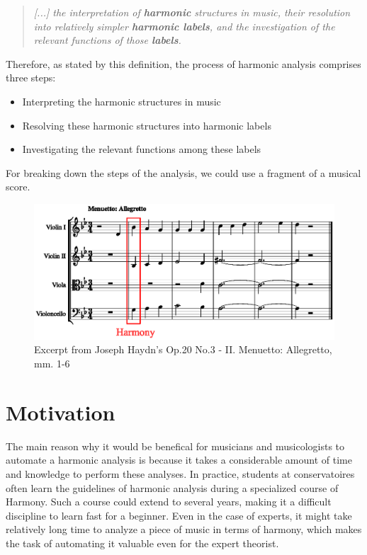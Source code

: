 \begin{quote}
\centering
\emph{[...] the interpretation of \textbf{harmonic} structures in music, \linebreak
their resolution into relatively simpler \textbf{harmonic labels}, \linebreak and the investigation of the relevant functions of those \textbf{labels}.}
\end{quote}

Therefore, as stated by this definition, the process of harmonic analysis comprises three steps:

\begin{itemize}
  \item Interpreting the harmonic structures in music
  \item Resolving these harmonic structures into harmonic labels
  \item Investigating the relevant functions among these labels
\end{itemize}

For breaking down the steps of the analysis, we could use a fragment of a musical score.

\begin{figure}[ht]
  \caption{Excerpt from Joseph Haydn's Op.20 No.3 - II. Menuetto: Allegretto, mm. 1-6}
  \centering
    \includegraphics[width=1.0\textwidth]{01-introduction/figures/1}
\end{figure}

\section{Motivation}
The main reason why it would be benefical for musicians and musicologists to automate a harmonic analysis is because it takes a considerable amount of time and knowledge to perform these analyses. In practice, students at conservatoires often learn the guidelines of harmonic analysis during a specialized course of Harmony. Such a course could extend to several years, making it a difficult discipline to learn fast for a beginner. Even in the case of experts, it might take relatively long time to analyze a piece of music in terms of harmony, which makes the task of automating it valuable even for the expert theorist.

